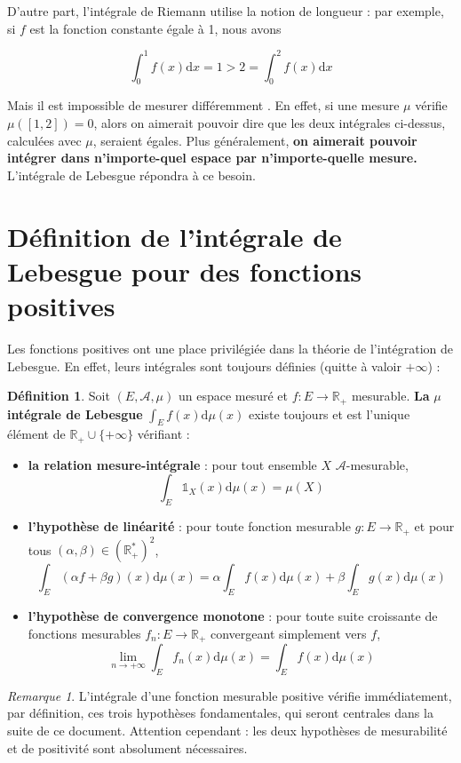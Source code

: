 \documentclass[french]{report}
\theoremstyle{plain}
\theoremstyle{definition}
\newtheorem{defi}{Définition}[section]
\theoremstyle{remark}
\newtheorem{rem}{Remarque}[section]
\newcommand\itemb{\item[$\bullet$]}
\begin{document}
D'autre part, l'intégrale de Riemann utilise la notion de longueur :
par exemple, si $f$ est la fonction constante égale à 1, nous avons

$$
\int_0^1f(x)\text{d}x = 1 > 2 = \int_0^2f(x)\text{d}x
$$

Mais il est impossible de \og mesurer différemment \fg.
En effet, si une mesure $\mu$ vérifie $\mu\left(\left[1,2\right]\right)=0$, alors on aimerait pouvoir dire que les deux intégrales ci-dessus, calculées avec $\mu$, seraient égales.
Plus généralement, \textbf{on aimerait pouvoir intégrer dans n'importe-quel espace par n'importe-quelle mesure.}
L'intégrale de Lebesgue répondra à ce besoin.

\section{Définition de l'intégrale de Lebesgue pour des fonctions positives}
\label{sect:defintpos}
Les fonctions positives ont une place privilégiée dans la théorie de l'intégration de Lebesgue.
En effet, leurs intégrales sont toujours définies (quitte à valoir $+\infty$) :

\begin{defi}
  Soit $\left(E,\mathcal{A},\mu\right)$ un espace mesuré et $f:E\rightarrow\mathbb{R}_+$ mesurable.
  \textbf{La} $\mu $\textbf{ intégrale de Lebesgue } $\displaystyle\int_Ef(x)\text{d}\mu(x)$ existe toujours et est l'unique élément de $\mathbb{R}_+\cup\{+\infty\}$ vérifiant :
  \begin{itemize}
    \itemb \textbf{la relation mesure-intégrale} : pour tout ensemble $X$ $\mathcal{A}$-mesurable,
    $$
    \int_E\mathds{1}_X(x)\text{d}\mu(x)=\mu(X)
    $$ 
    \itemb \textbf{l'hypothèse de linéarité} : pour toute fonction mesurable $g:E\rightarrow\mathbb{R}_+$ et pour tous $\left(\alpha,\beta\right) \in \left(\mathbb{R}_+^*\right)^2$,
    $$
    \int_E (\alpha f + \beta g)(x) \text{d}\mu(x)=\alpha\int_Ef(x)\text{d}\mu(x) + \beta\int_Eg(x)\text{d}\mu(x)
    $$
    \itemb \textbf{l'hypothèse de convergence monotone} : pour toute suite croissante de fonctions mesurables $f_n:E\rightarrow\mathbb{R}_+$ convergeant simplement vers $f$,
    $$
    \lim_{n\rightarrow+\infty}\int_Ef_n(x)\text{d}\mu(x)=\int_Ef(x)\text{d}\mu(x)
    $$
  \end{itemize}
\end{defi}

\begin{rem}
  L'intégrale d'une fonction mesurable positive vérifie immédiatement, par définition, ces trois hypothèses fondamentales, qui seront centrales dans la suite de ce document.
  Attention cependant : les deux hypothèses de mesurabilité et de positivité sont absolument nécessaires.
\end{rem}
\end{document}

